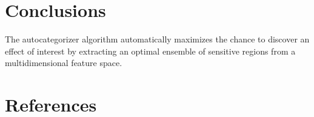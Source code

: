 \documentclass[review]{elsarticle}
\begin{document}
\section{Conclusions}
\label{conc}
The autocategorizer algorithm automatically maximizes the chance to discover an effect of interest by extracting an optimal ensemble of sensitive regions from a multidimensional feature space. 

\section*{References}


\end{document}
